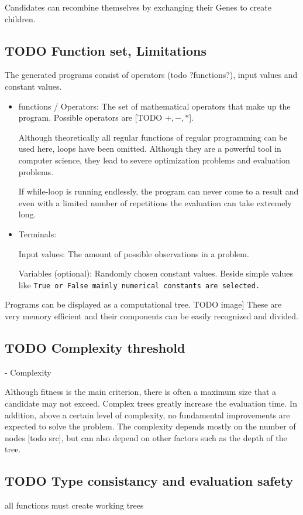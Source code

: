 Candidates can recombine themselves by exchanging their Genes to create children. 

\subsection{TODO Function set, Limitations}

The generated programs consist of operators (todo ?functions?), input values and constant values.

\begin{itemize}
    \item functions / Operators: The set of mathematical operators that make up the program. Possible operators are [TODO $+, -, *$]. 

    Although theoretically all regular functions of regular programming can be used here, loops have been omitted. Although they are a powerful tool in computer science, they lead to severe optimization problems and evaluation problems.
    
    If while-loop is running endlessly, the program can never come to a result and even with a limited number of repetitions the evaluation can take extremely long.
    

    \item Terminals:
    
    Input values: The amount of possible observations in a problem. 
    
    Variables (optional): Randomly chosen constant values. Beside simple values like \tt{True} or \tt{False} mainly numerical constants are selected.

\end{itemize}

Programs can be displayed as a computational tree. TODO image] These are very memory efficient and their components can be easily recognized and divided. 

\subsection{TODO Complexity threshold}


- Complexity

Although fitness is the main criterion, there is often a maximum size that a candidate may not exceed. Complex trees greatly increase the evaluation time. In addition, above a certain level of complexity, no fundamental improvements are expected to solve the problem. The complexity depends mostly on the number of nodes [todo src], but can also depend on other factors such as the depth of the tree.

\subsection{TODO Type consistancy and evaluation safety}

all functions must create working trees